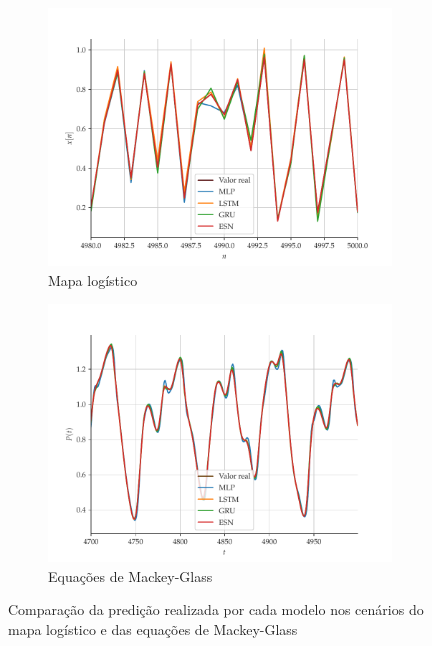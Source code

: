 \documentclass{article}
\begin{document}
\begin{figure}[!ht]
     \begin{subfigure}[t]{0.2\textwidth} 
         \includegraphics[scale=0.2]{vs-logistic-zoom.pdf}
         \caption{Mapa logístico}
     \end{subfigure}
     \centering
     \begin{subfigure}[t]{0.2\textwidth}
         \includegraphics[scale=0.2]{vs-mackeyglass-zoom.pdf}
         \caption{Equações de Mackey-Glass}
     \end{subfigure}
     \centering     
     \caption{Comparação da predição realizada por cada modelo nos cenários do mapa logístico e das equações de Mackey-Glass}
     \label{fig:series-comparison}
\end{figure}
\end{document}
